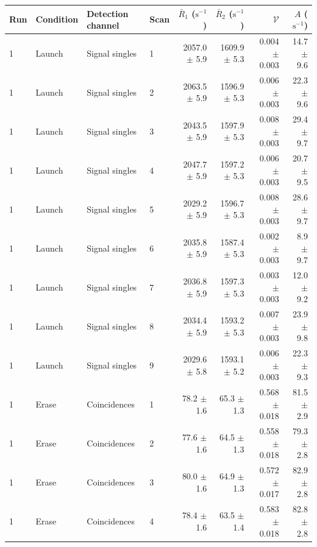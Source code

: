 \begin{tabular}{llllrrrr}
\toprule
Run & Condition & Detection channel & Scan & $\bar R_1$ ($\mathrm{s}^{-1}$) & $\bar R_2$ ($\mathrm{s}^{-1}$) & $\mathcal{V}$ & $A$ ($\mathrm{s}^{-1}$) \\
\midrule
1 & Launch & Signal singles & 1 & 2057.0 \ensuremath{\pm} 5.9 & 1609.9 \ensuremath{\pm} 5.3 & 0.004 \ensuremath{\pm} 0.003 & 14.7 \ensuremath{\pm} 9.6 \\
1 & Launch & Signal singles & 2 & 2063.5 \ensuremath{\pm} 5.9 & 1596.9 \ensuremath{\pm} 5.3 & 0.006 \ensuremath{\pm} 0.003 & 22.3 \ensuremath{\pm} 9.6 \\
1 & Launch & Signal singles & 3 & 2043.5 \ensuremath{\pm} 5.9 & 1597.9 \ensuremath{\pm} 5.3 & 0.008 \ensuremath{\pm} 0.003 & 29.4 \ensuremath{\pm} 9.7 \\
1 & Launch & Signal singles & 4 & 2047.7 \ensuremath{\pm} 5.9 & 1597.2 \ensuremath{\pm} 5.3 & 0.006 \ensuremath{\pm} 0.003 & 20.7 \ensuremath{\pm} 9.5 \\
1 & Launch & Signal singles & 5 & 2029.2 \ensuremath{\pm} 5.9 & 1596.7 \ensuremath{\pm} 5.3 & 0.008 \ensuremath{\pm} 0.003 & 28.6 \ensuremath{\pm} 9.7 \\
1 & Launch & Signal singles & 6 & 2035.8 \ensuremath{\pm} 5.9 & 1587.4 \ensuremath{\pm} 5.3 & 0.002 \ensuremath{\pm} 0.003 & 8.9 \ensuremath{\pm} 9.7 \\
1 & Launch & Signal singles & 7 & 2036.8 \ensuremath{\pm} 5.9 & 1597.3 \ensuremath{\pm} 5.3 & 0.003 \ensuremath{\pm} 0.003 & 12.0 \ensuremath{\pm} 9.2 \\
1 & Launch & Signal singles & 8 & 2034.4 \ensuremath{\pm} 5.9 & 1593.2 \ensuremath{\pm} 5.3 & 0.007 \ensuremath{\pm} 0.003 & 23.9 \ensuremath{\pm} 9.8 \\
1 & Launch & Signal singles & 9 & 2029.6 \ensuremath{\pm} 5.8 & 1593.1 \ensuremath{\pm} 5.2 & 0.006 \ensuremath{\pm} 0.003 & 22.3 \ensuremath{\pm} 9.3 \\
\midrule
1 & Erase & Coincidences & 1 & 78.2 \ensuremath{\pm} 1.6 & 65.3 \ensuremath{\pm} 1.3 & 0.568 \ensuremath{\pm} 0.018 & 81.5 \ensuremath{\pm} 2.9 \\
1 & Erase & Coincidences & 2 & 77.6 \ensuremath{\pm} 1.6 & 64.5 \ensuremath{\pm} 1.3 & 0.558 \ensuremath{\pm} 0.018 & 79.3 \ensuremath{\pm} 2.8 \\
1 & Erase & Coincidences & 3 & 80.0 \ensuremath{\pm} 1.6 & 64.9 \ensuremath{\pm} 1.3 & 0.572 \ensuremath{\pm} 0.017 & 82.9 \ensuremath{\pm} 2.8 \\
1 & Erase & Coincidences & 4 & 78.4 \ensuremath{\pm} 1.6 & 63.5 \ensuremath{\pm} 1.4 & 0.583 \ensuremath{\pm} 0.018 & 82.8 \ensuremath{\pm} 2.8 \\

\end{tabular}
